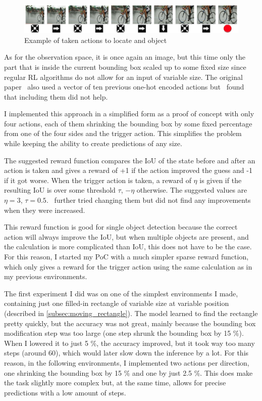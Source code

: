 \documentclass[
  digital,     %
  oneside,     %
  nosansbold,  %
  nocolorbold, %
  lof,         %
  lot,         %
]{fithesis4}
\begin{document}
\begin{figure}
    \centering
    \includegraphics[width=1\linewidth]{diagrams/45.jpg}
    \caption{Example of taken actions to locate and object~\cite{iterative_od_with_rl}}
    \label{fig:exmaple_from_paper}
\end{figure}

As for the observation space, it is once again an image, but this time only the part that is inside the current bounding box scaled up to some fixed size since regular RL algorithms do not allow for an input of variable size. The original paper~\cite{iterative_od_with_rl} also used a vector of ten previous one-hot encoded actions but~\cite{rl_object_detection} found that including them did not help.

I implemented this approach in a simplified form as a proof of concept with only four actions, each of them shrinking the bounding box by some fixed percentage from one of the four sides and the trigger action. This simplifies the problem while keeping the ability to create predictions of any size.

The suggested reward function compares the IoU of the state before and after an action is taken and gives a reward of +1 if the action improved the guess and -1 if it got worse. When the trigger action is taken, a reward of $\eta$ is given if the resulting IoU is over some threshold $\tau$, $-\eta$ otherwise. The suggested values are $\eta=3$, $\tau=0.5$.~\cite{rl_object_detection} further tried changing them but did not find any improvements when they were increased.

This reward function is good for single object detection because the correct action will always improve the IoU, but when multiple objects are present, and the calculation is more complicated than IoU, this does not have to be the case. For this reason, I started my PoC with a much simpler sparse reward function, which only gives a reward for the trigger action using the same calculation as in my previous environments.

The first experiment I did was on one of the simplest environments I made, containing just one filled-in rectangle of variable size at variable position (described in \ref{subsec:moving_rectangle}). The model learned to find the rectangle pretty quickly, but the accuracy was not great, mainly because the bounding box modification step was too large (one step shrunk the bounding box by 15 \%). When I lowered it to just 5 \%, the accuracy improved, but it took way too many steps (around 60), which would later slow down the inference by a lot. For this reason, in the following environments, I implemented two actions per direction, one shrinking the bounding box by 15 \% and one by just 2.5 \%. This does make the task slightly more complex but, at the same time, allows for precise predictions with a low amount of steps.
\end{document}
